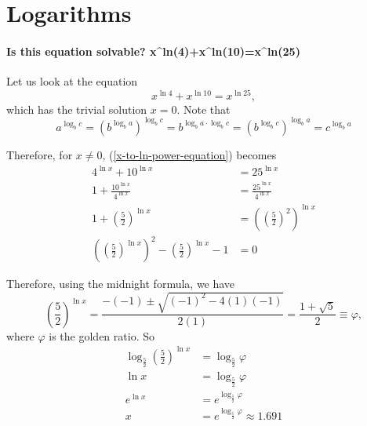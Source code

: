 \chapter{Logarithms}
\subsubsection*{Is this equation solvable? x\^{}ln(4)+x\^{}ln(10)=x\^{}ln(25)}
Let us look at the equation
\begin{equation}
	\label{x-to-ln-power-equation}
	x^{\ln 4 } + x^{\ln 10} = x^{\ln 25 },
\end{equation}
which has the trivial solution $x=0$. Note that
\begin{equation}
	a^{\log_b c} = \left( b ^{\log_{b} a} \right) ^ {\log _b c} = b^{\log_b a \cdot \log_b c} = \left( b^{\log_b c }\right) ^{\log_b a} = c^{\log_b a}
\end{equation}

Therefore, for $x \neq 0$, (\ref{x-to-ln-power-equation}) becomes
\begin{align}
	4^{\ln x} + 10^{\ln x}& = 25^{\ln x} \\
	1 + 
	\frac{10^{\ln x}}{4^{\ln x}} & = 
	\frac{25^{\ln x}}{4^{\ln x}} \\
	1 + \left( \frac{5}{2} \right)^{\ln x} &=
	\left( \left(  \frac{5}{2} \right)^2 \right)^{\ln x} \\
	\left( \left(  \frac{5}{2} \right)^{\ln x} \right)^2
	-\left( \frac{5}{2} \right)^{\ln x} -1 &= 0
\end{align}

Therefore, using the midnight formula, we have
\begin{equation}
	\left( \frac{5}{2} \right)^{\ln x}=\frac{-(-1)\pm \sqrt{(-1)^2-4(1)(-1)}}{2(1)}=\frac{1 + \sqrt{5}}{2} \equiv \varphi,
\end{equation}
where $\varphi$ is the golden ratio. So
\begin{align}
	\log_{\frac{5}{2}} \left( \frac{5}{2} \right)^{\ln x} & =
	\log_{\frac{5}{2}} \varphi \\
	\ln x &= \log_{\frac{5}{2}} \varphi \\
	e^{\ln x} &= e^{\log_{\frac{5}{2}}\varphi} \\
	x &= e^{\log_{\frac{5}{2}}\varphi} \approx 1.691
\end{align}
